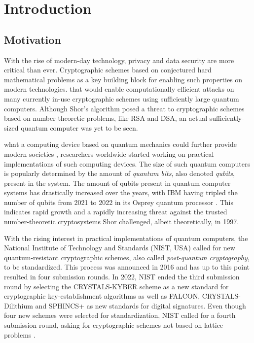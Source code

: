 \section{Introduction} \label{sec:intro}
\subsection{Motivation}
With the rise of modern-day technology, privacy and data security are more critical than ever. Cryptographic schemes based on conjectured hard mathematical problems  as a key building block for enabling such properties on modern technologies.  that would enable computationally efficient attacks on many currently in-use cryptographic schemes using sufficiently large quantum computers. Although Shor's algorithm posed a threat to cryptographic schemes based on number theoretic problems, like RSA and DSA, an actual sufficiently-sized quantum computer was yet to be seen. 

 what a computing device based on quantum mechanics could further provide modern societies , researchers worldwide started working on practical implementations of such computing devices. The size of such quantum computers is popularly determined by the amount of \textit{quantum bits}, also denoted \textit{qubits}, present in the system. The amount of qubits present in quantum computer systems has drastically increased over the years, with IBM having tripled the number of qubits from 2021 to 2022 in its Osprey quantum processor \cite{IBM_Osprey}. This indicates rapid growth and a rapidly increasing threat against the trusted number-theoretic cryptosystems Shor challenged, albeit theoretically, in 1997.

With the rising interest in practical implementations of quantum computers, the National Institute of Technology and Standards (NIST, USA) called for new quantum-resistant cryptographic schemes, also called \textit{post-quantum cryptography}, to be standardized. This process was announced in 2016 and has up to this point resulted in four submission rounds. In 2022, NIST ended the third submission round by selecting the CRYSTALS-KYBER scheme as a new standard for cryptographic key-establishment algorithms as well as FALCON, CRYSTALS-Dilithium and SPHINCS+ as new standards for digital signatures. Even though four new schemes were selected for standardization, NIST called for a fourth submission round, asking for cryptographic schemes not based on lattice problems \cite{nist_third_rd_update}. 

